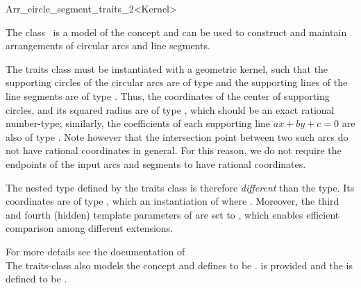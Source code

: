 
\ccRefPageBegin
\begin{ccRefClass}{Arr_circle_segment_traits_2<Kernel>}

\ccDefinition

The class \ccRefName\ is a model of the  concept
and can be used to construct and maintain arrangements of circular arcs
and line segments.

The traits class must be instantiated with a geometric kernel, such that
the supporting circles of the circular arcs are of type 
and the supporting lines of the line segments are of type .
Thus, the coordinates of the center of supporting circles, and its squared
radius are of type , which should be an exact rational
number-type; similarly, the coefficients of each supporting line
$ax + by + c = 0$ are also of type . Note however that
the intersection point between two such arcs do not have rational coordinates
in general. For this reason, we do not require the endpoints of the input arcs
and segments to have rational coordinates.

The nested  type defined by the traits class is therefore
{\em different} than the  type. Its coordinates are
of type , which an instantiation of 
 where .
Moreover, the third and fourth (hidden) template parameters of 
 are set to , which 
enables efficient comparison among different extensions. 

For more details see the documentation of \\

The traits-class also models the  concept
and defines  to
be .
 is provided and the 
is defined to be .

 

\end{ccRefClass}
